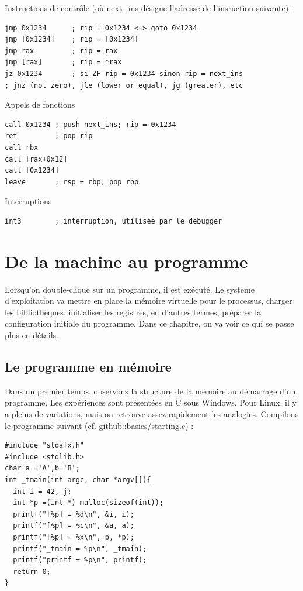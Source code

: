 \documentclass{book}
\newcommand{\C}{\textsc{C}\xspace}
\begin{document}
Instructions de contrôle (où next\_ins désigne l'adresse de l'insruction suivante) : 
\begin{verbatim}
jmp 0x1234      ; rip = 0x1234 <=> goto 0x1234
jmp [0x1234]    ; rip = [0x1234]
jmp rax         ; rip = rax
jmp [rax]       ; rip = *rax
jz 0x1234       ; si ZF rip = 0x1234 sinon rip = next_ins
; jnz (not zero), jle (lower or equal), jg (greater), etc
\end{verbatim}

Appels de fonctions
\begin{verbatim}
call 0x1234 ; push next_ins; rip = 0x1234
ret         ; pop rip
call rbx
call [rax+0x12]
call [0x1234]
leave       ; rsp = rbp, pop rbp
\end{verbatim}

Interruptions
\begin{verbatim}
int3        ; interruption, utilisée par le debugger
\end{verbatim}

\chapter{De la machine au programme}

Lorsqu'on double-clique sur un programme, il est exécuté. Le système d'exploi\-tation va mettre en place la mémoire virtuelle pour le processus, charger les bibliothèques, initialiser les registres, en d'autres termes, préparer la configuration initiale du programme. Dans ce chapitre, on va voir ce qui se passe plus en détails. 

\section{Le programme en mémoire}

Dans un premier temps, observons la structure de la mémoire au démarrage d'un programme. Les expériences sont présentées en \C sous Windows. Pour Linux, il y a pleins de variations, mais on retrouve assez rapidement les analogies. Compilons le programme suivant (cf. github::basics/starting.c) : 

\begin{verbatim}
#include "stdafx.h"
#include <stdlib.h>
char a ='A',b='B';
int _tmain(int argc, char *argv[]){
  int i = 42, j;
  int *p =(int *) malloc(sizeof(int));
  printf("[%p] = %d\n", &i, i);
  printf("[%p] = %c\n", &a, a);
  printf("[%p] = %x\n", p, *p);
  printf("_tmain = %p\n", _tmain);
  printf("printf = %p\n", printf);
  return 0;
}
\end{verbatim}
\end{document}

